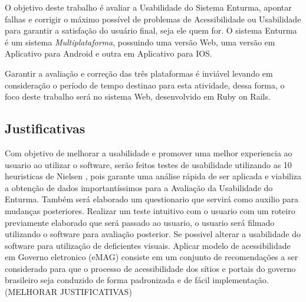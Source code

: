 	O objetivo deste trabalho é avaliar a Usabilidade do Sistema Enturma, apontar falhas e corrigir o máximo possível de problemas de Acessibilidade ou Usabilidade para garantir a satisfação do usuário final, seja ele quem for. O sistema Enturma é um sistema \textit{Multiplataforma}, possuindo uma versão Web, uma versão em Aplicativo para Android e outra em Aplicativo para IOS.

	Garantir a avaliação e correção das três plataformas é inviável levando em consideração o período de tempo destinao para esta atividade, dessa forma, o foco deste trabalho será no sistema Web, desenvolvido em Ruby on Rails.

\subsection{Justificativas}

	
	Com objetivo de melhorar a usabilidade e promover uma melhor experiencia ao usuario ao utilizar o software, serão feitos testes de usabilidade utilizando as 10 heuristicas de Nielsen \cite{usabilidade_web}, pois garante uma análise rápida de ser aplicada e viabiliza a obtenção de dados importantíssimos para a Avaliação da Usabilidade do Enturma.
	Também será elaborado um questionario que servirá como auxilio para mudanças posteriores.
	Realizar um teste intuitivo com o usuario com um roteiro previamente elaborado que será passado ao usuario,
	o usuario será filmado utilizando o software para avaliação posterior.
	Se possivel alterar a usabilidade do software para utilização de deficientes visuais.
	Aplicar modelo de acessibilidade em Governo eletronico (eMAG) consiste em um conjunto de recomendações a ser considerado para que o processo de acessibilidade dos sítios e portais do governo brasileiro seja conduzido de forma padronizada e de fácil implementação.
	(MELHORAR JUSTIFICATIVAS)



